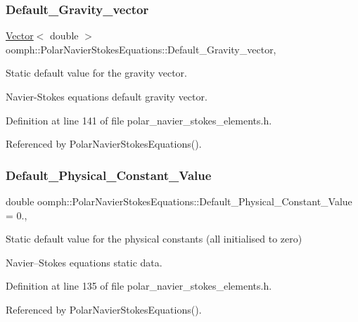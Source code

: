 \subsubsection{\texorpdfstring{Default\+\_\+\+Gravity\+\_\+vector}{Default\_Gravity\_vector}}
{\footnotesize\ttfamily \hyperlink{classoomph_1_1Vector}{Vector}$<$ double $>$ oomph\+::\+Polar\+Navier\+Stokes\+Equations\+::\+Default\+\_\+\+Gravity\+\_\+vector\hspace{0.3cm}{\ttfamily [static]}, {\ttfamily [private]}}



Static default value for the gravity vector. 

Navier-\/\+Stokes equations default gravity vector. 

Definition at line 141 of file polar\+\_\+navier\+\_\+stokes\+\_\+elements.\+h.



Referenced by Polar\+Navier\+Stokes\+Equations().

\mbox{\label{classoomph_1_1PolarNavierStokesEquations_a21029e3ad077fda4efe1290ed17cfa97}} 
\subsubsection{\texorpdfstring{Default\+\_\+\+Physical\+\_\+\+Constant\+\_\+\+Value}{Default\_Physical\_Constant\_Value}}
{\footnotesize\ttfamily double oomph\+::\+Polar\+Navier\+Stokes\+Equations\+::\+Default\+\_\+\+Physical\+\_\+\+Constant\+\_\+\+Value = 0.\hspace{0.3cm}{\ttfamily [static]}, {\ttfamily [private]}}



Static default value for the physical constants (all initialised to zero) 

Navier--Stokes equations static data. 

Definition at line 135 of file polar\+\_\+navier\+\_\+stokes\+\_\+elements.\+h.



Referenced by Polar\+Navier\+Stokes\+Equations().

